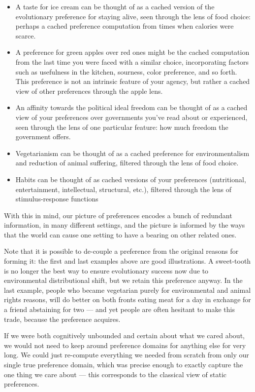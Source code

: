\documentclass{article}
\theoremstyle{plain}
\theoremstyle{definition}
\theoremstyle{remark}
\begin{document}
	\begin{itemize}[nosep]
		\item A taste for ice cream can be thought of as a cached version of the evolutionary preference for staying alive, seen through the lens of food choice: perhaps a cached preference computation from times when calories were scarce.
		\item A preference for green apples over red ones might be the cached computation from the last time you were faced with a similar choice, incorporating factors such as usefulness in the kitchen, sourness, color preference, and so forth. This preference is not an intrinsic feature of your agency, but rather a cached view of other preferences through the apple lens.
		\item An affinity towards the political ideal freedom can be thought of as a cached view of your preferences over governments you've read about or experienced, seen through the lens of one particular feature: how much freedom the government offers.
		\item Vegetarianism can be thought of as a cached preference for environmentalism and reduction of animal suffering, filtered through the lens of food choice.
		\item Habits can be thought of as cached versions of your preferences (nutritional, entertainment, intellectual, structural, etc.), filtered through the lens of stimulus-response functions
	\end{itemize}
	
	With this in mind, our picture of preferences encodes a bunch of redundant information, in many different settings, and the picture is informed by the ways that the world can cause one setting to have a bearing on other related ones. 
	
	Note that it is possible to de-couple a preference from the original reasons for forming it: the first and last examples above are good illustrations. A sweet-tooth is no longer the best way to ensure evolutionary success now due to environmental distributional shift, but we retain this preference anyway. In the last example, people who became vegetarian purely for environmental and animal rights reasons, will do better on both fronts eating meat for a day in exchange for a friend abstaining for two --- and yet people are often hesitant to make this trade, because the preference acquires.
	
	If we were both cognitively unbounded and certain about what we cared about, we would not need to keep around preference domains for anything else for very long. We could just re-compute everything we needed from scratch from only our single true preference domain, which was precise enough to exactly capture the one thing we care about --- this corresponds to the classical view of static preferences.
	
\end{document}
